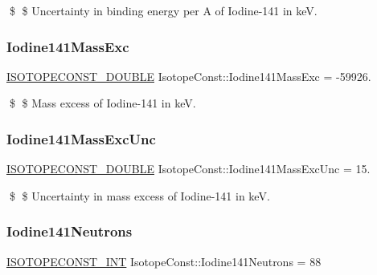 \$ \$ Uncertainty in binding energy per A of Iodine-\/141 in keV. \mbox{\label{group___isotope_const-_iodine-_i141_ga08e41e889c31552452855b923eade005}} 
\subsubsection{\texorpdfstring{Iodine141\+Mass\+Exc}{Iodine141MassExc}}
{\footnotesize\ttfamily \mbox{\hyperlink{group___isotope_const-_macros_ga8f45a7272ce02c0b4c65c44636ed719a}{I\+S\+O\+T\+O\+P\+E\+C\+O\+N\+S\+T\+\_\+\+D\+O\+U\+B\+LE}} Isotope\+Const\+::\+Iodine141\+Mass\+Exc = -\/59926.}

\$ \$ Mass excess of Iodine-\/141 in keV. \mbox{\label{group___isotope_const-_iodine-_i141_ga8314c1f36ddc2829486e8e6addf41ba5}} 
\subsubsection{\texorpdfstring{Iodine141\+Mass\+Exc\+Unc}{Iodine141MassExcUnc}}
{\footnotesize\ttfamily \mbox{\hyperlink{group___isotope_const-_macros_ga8f45a7272ce02c0b4c65c44636ed719a}{I\+S\+O\+T\+O\+P\+E\+C\+O\+N\+S\+T\+\_\+\+D\+O\+U\+B\+LE}} Isotope\+Const\+::\+Iodine141\+Mass\+Exc\+Unc = 15.}

\$ \$ Uncertainty in mass excess of Iodine-\/141 in keV. \mbox{\label{group___isotope_const-_iodine-_i141_gaceacd271c789204564722f19b34bca22}} 
\subsubsection{\texorpdfstring{Iodine141\+Neutrons}{Iodine141Neutrons}}
{\footnotesize\ttfamily \mbox{\hyperlink{group___isotope_const-_macros_ga5f18360b3e99483a35c32d789e62621c}{I\+S\+O\+T\+O\+P\+E\+C\+O\+N\+S\+T\+\_\+\+I\+NT}} Isotope\+Const\+::\+Iodine141\+Neutrons = 88}

